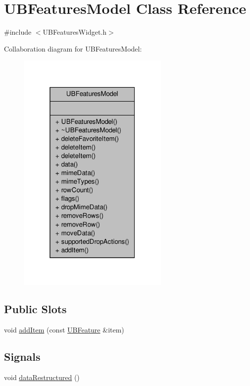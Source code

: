 \hypertarget{class_u_b_features_model}{\section{U\-B\-Features\-Model Class Reference}
\label{d5/d7a/class_u_b_features_model}
}


{\ttfamily \#include $<$U\-B\-Features\-Widget.\-h$>$}



Collaboration diagram for U\-B\-Features\-Model\-:
\nopagebreak
\begin{figure}[H]
\begin{center}
\leavevmode
\includegraphics[width=208pt]{d4/d4d/class_u_b_features_model__coll__graph}
\end{center}
\end{figure}
\subsection*{Public Slots}
\begin{DoxyCompactItemize}
\item 
void \hyperlink{class_u_b_features_model_ac904dec2116695af0fdc95f23d3940f2}{add\-Item} (const \hyperlink{class_u_b_feature}{U\-B\-Feature} \&item)
\end{DoxyCompactItemize}
\subsection*{Signals}
\begin{DoxyCompactItemize}
\item 
void \hyperlink{class_u_b_features_model_a92e17912ae2981a405021bd74696182a}{data\-Restructured} ()
\end{DoxyCompactItemize}
